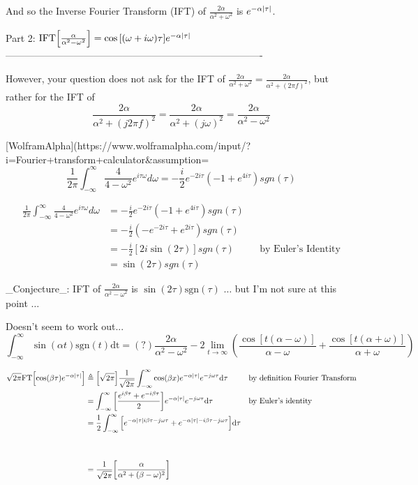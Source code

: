And so the Inverse Fourier Transform (IFT) of $\frac{2\alpha}{\alpha^2+\omega^2}$
is $e^{-\alpha{\left\lvert \tau \right\rvert}}$.

Part 2: $\mathrm{IFT}{\left[\frac{\alpha}{\alpha^2-\omega^2}\right]} = \cos{\left[(\omega + i\omega)\tau\right]}e^{-\alpha{\left\lvert \tau \right\rvert}}$
-------------------------------------------------------------------------------

However, your question does not ask for the IFT of 
$\frac{2\alpha}{\alpha^2+\omega^2}=\frac{2\alpha}{\alpha^2+(2\pi f)^2}$,
but rather for the IFT of 
$$
  \frac{2\alpha}{\alpha^2+(j2\pi f)^2}
    = \frac{2\alpha}{\alpha^2+(j\omega)^2}
    =\frac{2\alpha}{\alpha^2-\omega^2}
$$


[WolframAlpha](https://www.wolframalpha.com/input/?i=Fourier+transform+calculator&assumption=%
$$\frac{1}{2\pi}\int_{-\infty}^{\infty}\frac{4}{4-\omega^2}e^{i\tau\omega}d\omega 
= -\frac{i}{2}e^{-2i\tau}(-1+e^{4i\tau})sgn(\tau)
$$

\begin{align}
  \frac{1}{2\pi}\int_{-\infty}^{\infty}\frac{4}{4-\omega^2}e^{i\tau\omega}d\omega 
    &= -\frac{i}{2}e^{-2i\tau}(-1+e^{4i\tau})sgn(\tau)
  \\&= -\frac{i}{2}(-e^{-2i\tau}+e^{2i\tau})sgn(\tau)
  \\&= -\frac{i}{2}[2i\sin(2\tau)]sgn(\tau)
    && \text{by Euler's Identity}
  \\&= \sin(2\tau)sgn(\tau)
\end{align}

_Conjecture_: IFT of $\frac{2\alpha}{\alpha^2-\omega^2}$ is $\sin(2\tau)\mathrm{sgn}(\tau)$
$\ldots$ but I'm not sure at this point $\ldots$

Doesn't seem to work out... $$\int_{-\infty}^\infty\sin(\alpha t)\mathrm{sgn}(t)\mathrm{dt} =(?) \frac{2\alpha}{\alpha^2-\omega^2} -2 \lim_{t\to\infty}( \frac{\cos[t(\alpha-\omega)]}{\alpha-\omega} + \frac{\cos[t(\alpha+\omega)]}{\alpha+\omega})$$


\begin{align*}
  \sqrt{2\pi}\mathrm{FT}{\left[\cos(\beta\tau)e^{-\alpha{\left\lvert \tau \right\rvert}}\right]}
    &\triangleq {\left[\sqrt{2\pi}\right]}\frac{1}{\sqrt{2\pi}}\int_{-\infty}^{\infty} \cos(\beta x)e^{-\alpha{\left\lvert \tau \right\rvert}} e^{-j\omega\tau}\mathrm{d\tau}
    && \text{by definition Fourier Transform}
  \\&= \int_{-\infty}^{\infty} {\left[\frac{e^{i\beta\tau}+e^{-i\beta\tau}}{2}\right]} e^{-\alpha{\left\lvert \tau \right\rvert}} e^{-j\omega\tau}\mathrm{d\tau}
    &&  \text{by Euler's identity}
  \\&= \frac{1}{2}\int_{-\infty}^{\infty} {\left[e^{-\alpha{\left\lvert \tau \right\rvert}i\beta\tau-j\omega\tau}+e^{-\alpha{\left\lvert \tau \right\rvert}-i\beta\tau-j\omega\tau}\right]} \mathrm{d\tau}
  \\
  \\
  \\&= \frac{1}{\sqrt{2\pi}}{\left[\frac{\alpha}{\alpha^2+(\beta-\omega)^2}\right]}
\end{align*}
